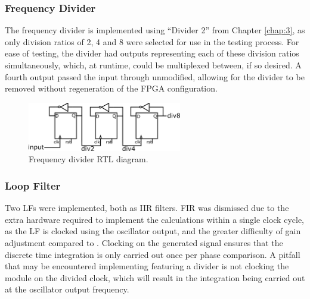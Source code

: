 \subsubsection{Frequency Divider}
The frequency divider is implemented using ``Divider 2'' from Chapter \ref{chap:3}, as only division ratios of 2, 4 and 8 were selected for use in the testing process. For ease of testing, the divider had outputs representing each of these division ratios simultaneously, which, at runtime, could be multiplexed between, if so desired. A fourth output passed the input through unmodified, allowing for the divider to be removed without regeneration of the \ac{FPGA} configuration.
\begin{figure}[h]%
    \centering
    \includegraphics[width=0.6\textwidth]{../divider2}
    \caption[Frequency divider \ac{RTL} diagram]{Frequency divider \ac{RTL} diagram.}
    \label{fig:divs_impl}
\end{figure}

\subsubsection{Loop Filter}
Two \aclp{LF} were implemented, both as \ac{IIR} filters. \ac{FIR} was dismissed due to the extra hardware required to implement the calculations within a single clock cycle, as the \ac{LF} is clocked using the oscillator output, and the greater difficulty of gain adjustment compared to . Clocking on the generated signal ensures that the discrete time integration is only carried out once per phase comparison. A pitfall that may be encountered implementing  featuring a divider is not clocking the module on the divided clock, which will result in the integration being carried out at the oscillator output frequency.

